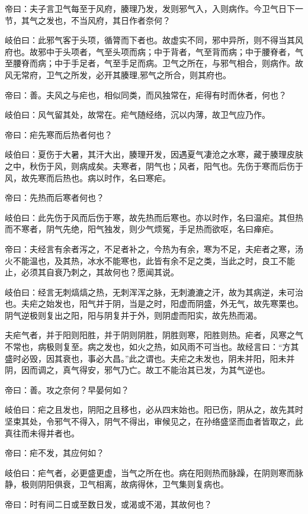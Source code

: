 \documentclass{article}%
\begin{document}
帝曰：夫子言卫气每至于风府，腠理乃发，发则邪气入，入则病作。今卫气日下一节，其气之发也，不当风府，其日作者奈何？

岐伯曰：此邪气客于头项，循膂而下者也。故虚实不同，邪中异所，则不得当其风府也。故邪中于头项者，气至头项而病；中于背者，气至背而病；中于腰脊者，气至腰脊而病；中于手足者，气至手足而病。卫气之所在，与邪气相合，则病作。故风无常府，卫气之所发，必开其腠理,邪气之所合，则其府也。

帝曰：善。夫风之与疟也，相似同类，而风独常在，疟得有时而休者，何也？

岐伯曰：风气留其处，故常在。疟气随经络，沉以内薄，故卫气应乃作。

帝曰：疟先寒而后热者何也？

岐伯曰：夏伤于大暑，其汗大出，腠理开发，因遇夏气凄沧之水寒，藏于腠理皮肤之中，秋伤于风，则病成矣。夫寒者，阴气也；风者，阳气也。先伤于寒而后伤于风，故先寒而后热也。病以时作，名曰寒疟。

帝曰：先热而后寒者何也？

岐伯曰：此先伤于风而后伤于寒，故先热而后寒也。亦以时作，名曰温疟。其但热而不寒者，阴气先绝，阳气独发，则少气烦冤，手足热而欲呕，名曰瘅疟。

帝曰：夫经言有余者泻之，不足者补之，今热为有余，寒为不足，夫疟者之寒，汤火不能温也，及其热，冰水不能寒也，此皆有余不足之类，当此之时，良工不能止，必须其自衰乃刺之，其故何也？愿闻其说。

岐伯曰：经言无刺熇熇之热，无刺浑浑之脉，无刺漉漉之汗，故为其病逆，未可治也。夫疟之始发也，阳气并于阴，当是之时，阳虚而阴盛，外无气，故先寒栗也。阴气逆极则复出之阳，阳与阴复并于外，则阴虚而阳实，故先热而渴。

夫疟气者，并于阳则阳胜，并于阴则阴胜，阴胜则寒，阳胜则热。疟者，风寒之气不常也，病极则复至。病之发也，如火之热，如风雨不可当也。故经言曰：“方其盛时必毁，因其衰也，事必大昌。”此之谓也。夫疟之未发也，阴未并阳，阳未并阴，因而调之，真气得安，邪气乃亡。故工不能治其已发，为其气逆也。

帝曰：善。攻之奈何？早晏何如？

岐伯曰：疟之且发也，阴阳之且移也，必从四末始也。阳已伤，阴从之，故先其时坚束其处，令邪气不得入，阴气不得出，审候见之，在孙络盛坚而血者皆取之，此真往而未得并者也。

帝曰：疟不发，其应何如？

岐伯曰：疟气者，必更盛更虚，当气之所在也。病在阳则热而脉躁，在阴则寒而脉静，极则阴阳俱衰，卫气相离，故病得休，卫气集则复病也。

帝曰：时有间二日或至数日发，或渴或不渴，其故何也？
\end{document}
